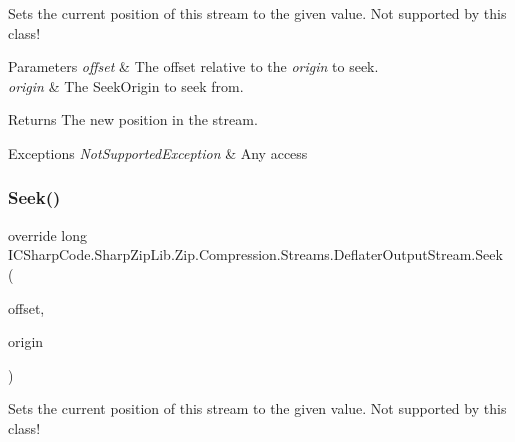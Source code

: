 Sets the current position of this stream to the given value. Not supported by this class! 


\begin{DoxyParams}{Parameters}
{\em offset} & The offset relative to the {\itshape origin}  to seek.\\
\hline
{\em origin} & The Seek\+Origin to seek from.\\
\hline
\end{DoxyParams}
\begin{DoxyReturn}{Returns}
The new position in the stream.
\end{DoxyReturn}

\begin{DoxyExceptions}{Exceptions}
{\em Not\+Supported\+Exception} & Any access\\
\hline
\end{DoxyExceptions}
\mbox{\label{class_i_c_sharp_code_1_1_sharp_zip_lib_1_1_zip_1_1_compression_1_1_streams_1_1_deflater_output_stream_a8b1da4accf17592cb5fd485fcab1ac26}} 
\subsubsection{\texorpdfstring{Seek()}{Seek()}\hspace{0.1cm}{\footnotesize\ttfamily [2/2]}}
{\footnotesize\ttfamily override long I\+C\+Sharp\+Code.\+Sharp\+Zip\+Lib.\+Zip.\+Compression.\+Streams.\+Deflater\+Output\+Stream.\+Seek (\begin{DoxyParamCaption}\item[{long}]{offset,  }\item[{Seek\+Origin}]{origin }\end{DoxyParamCaption})\hspace{0.3cm}{\ttfamily [inline]}}



Sets the current position of this stream to the given value. Not supported by this class! 


